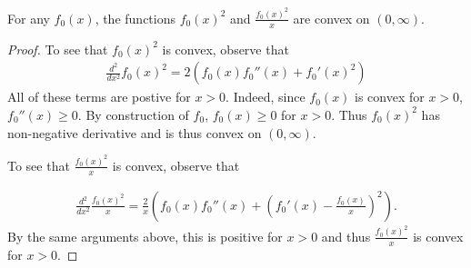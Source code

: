 \begin{lemma}\label{lemma:f0-x-convex}
For any $f_0(x)$,
the functions $f_0(x)^2$ and $\frac{f_0(x)^2}{x}$ are convex on $(0, \infty)$.
\end{lemma}
\begin{proof}
To see that $f_0(x)^2$ is convex, observe that 
\begin{align*}
    \frac{d^2}{dx^2} f_0(x)^2 = 2\left( f_0(x) f_0''(x) + f_0'(x)^2 \right)
\end{align*}
All of these terms are postive for $x > 0$.
Indeed, since $f_0(x)$ is convex for $x > 0$, $f_0''(x) \geq 0$.  
By construction of $f_0$, $f_0(x) \geq 0$ for $x > 0$. 
Thus $f_0(x)^2$ has non-negative derivative and is thus convex on $(0, \infty)$.

To see that $\frac{f_0(x)^2}{x}$ is convex, observe that

\begin{align*}
    \frac{d^2}{dx^2} \frac{f_0(x)^2}{x} = \frac{2}{x}\left( f_0(x) f_0''(x) + \left(f_0'(x) - \frac{f_0(x)}{x}\right)^2 \right).
\end{align*}
By the same arguments above, this is positive for $x > 0$ and thus $\frac{f_0(x)^2}{x}$ is convex for $x>0$.
\end{proof}

